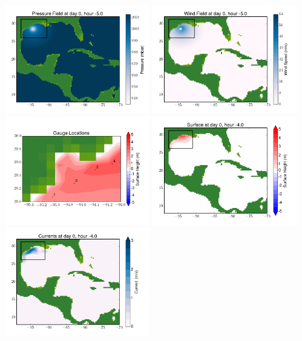 \documentclass[11pt]{article}
\begin{document}
\includegraphics[width=0.475\textwidth]{frame0067fig8.png}
\vskip 10pt 
\includegraphics[width=0.475\textwidth]{frame0067fig9.png}
\includegraphics[width=0.475\textwidth]{frame0067fig10.png}
\vskip 10pt 
\includegraphics[width=0.475\textwidth]{frame0068fig1.png}
\includegraphics[width=0.475\textwidth]{frame0068fig2.png}
\end{document}
